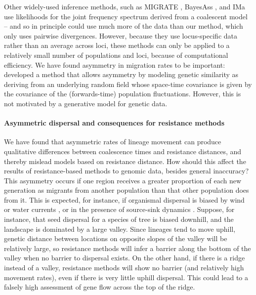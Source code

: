 \documentclass{article}
\begin{document}
Other widely-used inference methods, such as
MIGRATE \citep{beerli1999maximumlikelihood,beerli2010unified},
BayesAss \citep{wilson2003bayesian}, 
and IMa \citep{hey2007integration}
use likelihoods for the joint frequency spectrum derived from a coalescent model --
and so in principle could use much more of the data than our method,
which only uses pairwise divergences.
However, because they use locus-specific data rather than an average across loci,
these methods can only be applied to a relatively small number of populations and loci,
because of computational efficiency.
We have found asymmetry in migration rates to be important:
\citet{hanks2017modeling} developed a method that allows asymmetry
by modeling genetic similarity as deriving from an underlying random field
whose space-time covariance is given by the covariance of the (forwards-time) population fluctuations.
However, this is not motivated by a generative model for genetic data.


\paragraph{Asymmetric dispersal and consequences for resistance methods}
We have found that asymmetric rates of lineage movement
can produce qualitative differences between coalescence times and resistance distances,
and thereby mislead models based on resistance distance.
How should this affect the results of resistance-based methods to genomic data,
besides general inaccuracy?
This asymmetry occurs if one region receives a greater proportion of each new generation as migrants
from another population than that other population does from it.
This is expected, for instance,
if organismal dispersal is biased by wind or water currents \citep{gaines2003avoiding,morrissey2009maintenance},
or in the presence of source-sink dynamics \citep{dias1996sources,lenormand2002limits}.
Suppose, for instance, that seed dispersal for a species of tree
is biased downhill,
and the landscape is dominated by a large valley.
Since lineages tend to move uphill,
genetic distance between locations on opposite slopes of the valley will be relatively large,
so resistance methods will infer a barrier along the bottom of the valley
when no barrier to dispersal exists.
On the other hand, if there is a ridge instead of a valley,
resistance methods will show no barrier (and relatively high movement rates),
even if there is very little uphill dispersal.
This could lead to a falsely high assessment of gene flow across the top of the ridge.
\end{document}
